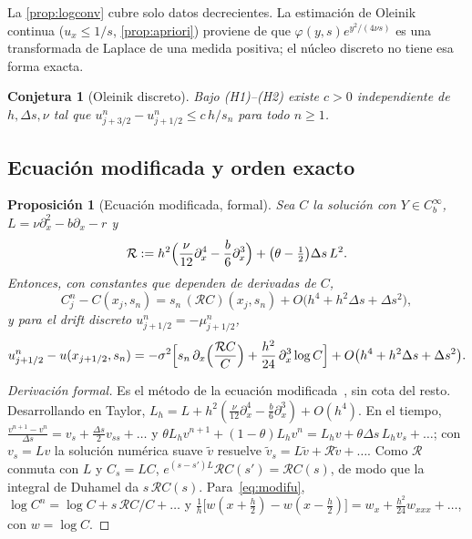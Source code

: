 \documentclass[11pt,letterpaper]{article}
\theoremstyle{plain}
\newtheorem{conjecture}[theorem]{Conjetura}
\newtheorem{proposicion}[theorem]{Proposición}
\theoremstyle{definition}
\theoremstyle{remark}
\numberwithin{equation}{section}
\begin{document}
	La \cref{prop:logconv} cubre solo datos decrecientes. La estimación de Oleinik continua (\(u_x\le1/s\), \cref{prop:apriori}) proviene de que \(\varphi(y,s)e^{y^2/(4\nu s)}\) es una transformada de Laplace de una medida positiva; el núcleo discreto no tiene esa forma exacta.
	
	\begin{conjecture}[Oleinik discreto]\label{conj:oleinik}
		Bajo (H1)--(H2) existe \(c>0\) independiente de \(h,\Delta s,\nu\) tal que \(u^n_{j+3/2}-u^n_{j+1/2}\le c\,h/s_n\) para todo \(n\ge1\).
	\end{conjecture}
	
	\subsection{Ecuación modificada y orden exacto}\label{subsec:modificada}
	
	\begin{proposicion}[Ecuación modificada, formal]\label{prop:modif}
		Sea \(C\) la solución con \(Y\in C_b^\infty\), \(L=\nu\partial_x^2-b\partial_x-r\) y
		\[
		\mathcal R:=h^2\Bigl(\frac\nu{12}\partial_x^4-\frac b6\partial_x^3\Bigr)+\bigl(\theta-\tfrac12\bigr)\Delta s\,L^2.
		\]
		Entonces, con constantes que dependen de derivadas de \(C\),
		\begin{equation}\label{eq:modif}
			C^n_j-C(x_j,s_n)=s_n\,(\mathcal RC)(x_j,s_n)+O\bigl(h^4+h^2\Delta s+\Delta s^2\bigr),
		\end{equation}
		y para el drift discreto \(u^n_{j+1/2}=-\mu^n_{j+1/2}\),
		\begin{equation}\label{eq:modifu}
			u^n_{j+1/2}-u(x_{j+1/2},s_n)=-\sigma^2\Bigl[s_n\,\partial_x\Bigl(\frac{\mathcal RC}{C}\Bigr)+\frac{h^2}{24}\,\partial_x^3\log C\Bigr]+O\bigl(h^4+h^2\Delta s+\Delta s^2\bigr).
		\end{equation}
	\end{proposicion}
	
	\begin{proof}[Derivación formal]
		Es el método de la ecuación modificada~\cite{WarmingHyett1974,GriffithsSanzSerna1986}, sin cota del resto. Desarrollando en Taylor, \(L_h=L+h^2(\frac\nu{12}\partial_x^4-\frac b6\partial_x^3)+O(h^4)\). En el tiempo, \(\frac{v^{n+1}-v^n}{\Delta s}=v_s+\frac{\Delta s}2v_{ss}+\dots\) y \(\theta L_hv^{n+1}+(1-\theta)L_hv^n=L_hv+\theta\Delta s\,L_hv_s+\dots\); con \(v_s=Lv\) la solución numérica suave \(\tilde v\) resuelve \(\tilde v_s=L\tilde v+\mathcal R\tilde v+\dots\). Como \(\mathcal R\) conmuta con \(L\) y \(C_s=LC\), \(e^{(s-s')L}\mathcal RC(s')=\mathcal RC(s)\), de modo que la integral de Duhamel da \(s\,\mathcal RC(s)\). Para~\eqref{eq:modifu}, \(\log C^n=\log C+s\,\mathcal RC/C+\dots\) y \(\frac1h\bigl[w(x+\frac h2)-w(x-\frac h2)\bigr]=w_x+\frac{h^2}{24}w_{xxx}+\dots\), con \(w=\log C\).
	\end{proof}
	
\end{document}
